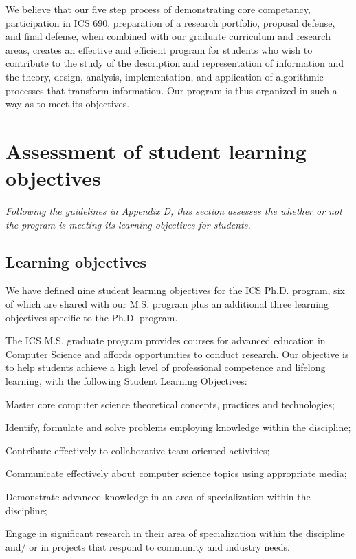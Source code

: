 \documentclass[12pt]{article}
\begin{document}
We believe that our five step process of demonstrating core competancy,
participation in ICS 690, preparation of a research portfolio, proposal
defense, and final defense, when combined with our graduate curriculum and
research areas, creates an effective and efficient program for students who
wish to contribute to the study of the description and representation of
information and the theory, design, analysis, implementation, and
application of algorithmic processes that transform information. Our
program is thus organized in such a way as to meet its objectives.


\section{Assessment of student learning objectives}

{\em Following the guidelines in Appendix D, this section assesses the
  whether or not the program is meeting its learning objectives for
  students. }

\subsection{Learning objectives}

We have defined nine student learning objectives for the ICS Ph.D. program,
six of which are shared with our M.S. program plus an additional three
learning objectives specific to the Ph.D. program.

The ICS M.S. graduate program provides courses for advanced education in
Computer Science and affords opportunities to conduct research. Our
objective is to help students achieve a high level of professional
competence and lifelong learning, with the following Student Learning
Objectives:

\begin{list}{.}{}
\item Master core computer science theoretical concepts, practices and technologies;
\item Identify, formulate and solve problems employing knowledge within the discipline;
\item Contribute effectively to collaborative team oriented activities;
\item Communicate effectively about computer science topics using appropriate media;
\item Demonstrate advanced knowledge in an area of specialization within the discipline;
\item Engage in signiﬁcant research in their area of specialization within the discipline and/
or in projects that respond to community and industry needs.
\end{list}
\end{document}
